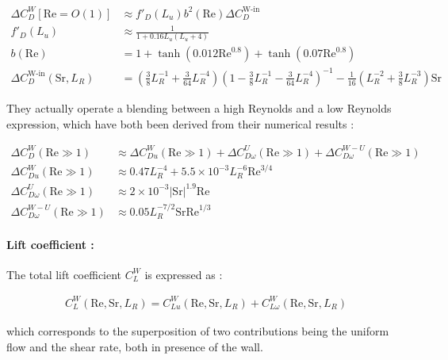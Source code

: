 \npar
\begin{align}
\Delta C_{D}^{W}\left[\text{Re}=O(1)\right] &\approx f'_{D}\left(L_{u}\right)b^{2}\left(\text{Re}\right)\Delta C_{D}^{\text{W-in}}\\
f'_{D}\left(L_{u}\right)&\approx \frac{1}{1+0.16L_{u}\left(L_{u}+4\right)} \\
b\left(\text{Re}\right)&= 1 + \tanh\left(0.012\text{Re}^{0.8}\right)+\tanh\left(0.07\text{Re}^{0.8}\right) \\
\Delta C_{D}^{\text{W-in}}\left(\text{Sr},L_{R}\right)&=\left(\frac{3}{8}L_{R}^{-1} + \frac{3}{64}L_{R}^{-4}\right) \left(1- \frac{3}{8}L_{R}^{-1}-\frac{3}{64}L_{R}^{-4}\right)^{-1} - \frac{1}{16}\left(L_{R}^{-2}+\frac{3}{8}L_{R}^{-3}\right)\text{Sr}
\end{align}

They actually operate a blending between a high Reynolds and a low Reynolds expression, which have both been derived from their numerical results :

\npar
\begin{align}
\Delta C_{D}^{W}\left(\text{Re}\gg1 \right) &\approx \Delta C_{Du}^{W}\left(\text{Re}\gg1\right) + \Delta C_{D\omega}^{U}\left(\text{Re}\gg1\right) + \Delta C_{D\omega}^{W-U}\left(\text{Re}\gg1\right)\\
\Delta C_{Du}^{W}\left(\text{Re}\gg1\right) &\approx 0.47L_{R}^{-4}+5.5\times 10^{-3}L_{R}^{-6}\text{Re}^{3/4} \\
\Delta C_{D\omega}^{U}\left(\text{Re}\gg1\right) &\approx 2 \times 10^{-3} \left|\text{Sr}\right|^{1.9}\text{Re} \\
\Delta C_{D\omega}^{W-U}\left(\text{Re}\gg1\right)&\approx 0.05L_{R}^{-7/2}\text{Sr}\text{Re}^{1/3}
\end{align}


\paragraph{Lift coefficient :} The total lift coefficient $C_{L}^{W}$ is expressed as :


\begin{align}
C_{L}^{W}\left(\text{Re}, \text{Sr}, L_{R}\right)=C_{Lu}^{W}\left(\text{Re}, \text{Sr}, L_{R}\right) + C_{L\omega}^{W}\left(\text{Re}, \text{Sr}, L_{R}\right)
\end{align}

which corresponds to the superposition of two contributions being the uniform flow and the shear rate, both in presence of the wall.

